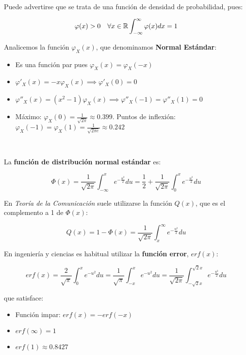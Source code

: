 \documentclass[11pt]{article}
\providecommand{\tightlist}{%
      \setlength{\itemsep}{0pt}\setlength{\parskip}{0pt}}
\begin{document}
Puede advertirse que se trata de una función de densidad de
probabilidad, pues:

\[\varphi(x) >0 \quad \forall x \in \mathbb{R}\\
\int_{-\infty}^\infty \varphi(x)dx = 1\]

    Analicemos la función \(\varphi_X(x)\), que denominamos \textbf{Normal
Estándar}:

\begin{itemize}
\tightlist
\item
  Es una función par pues \(\varphi_X(x) = \varphi_X(-x)\)
\item
  \(\varphi'_X(x) = -x\varphi_X(x) \implies \varphi'_X(0) = 0\)
\item
  \(\varphi''_X(x) = (x^2-1)\varphi_X(x) \implies \varphi''_X(-1) = \varphi''_X(1) = 0\)
\item
  Máximo: \(\varphi_X(0) = \frac{1}{\sqrt{2\pi}}\approx 0.399\). Puntos
  de inflexión:
  \(\varphi_X(-1) = \varphi_X(1) =\frac{1}{\sqrt{2\pi e}}\approx 0.242\)
\end{itemize}

    \begin{center}
    \end{center}
    { \hspace*{\fill} \\}
    
    La \textbf{función de distribución normal estándar} es:

\[\Phi(x) = \frac{1}{\sqrt{2\pi}} \int_{-\infty}^x  e^{-\frac{u^2}{2}} du = 
\frac{1}{2} + \frac{1}{\sqrt{2\pi}} \int_{0}^x  e^{-\frac{u^2}{2}} du
\]

En \emph{Teoría de la Comunicación} suele utilizarse la función
\(Q(x)\), que es el complemento a 1 de \(\Phi(x)\):

\[Q(x) = 1-\Phi(x) = \frac{1}{\sqrt{2\pi}} \int_x^{\infty}  e^{-\frac{u^2}{2}} du\]

    En ingeniería y ciencias es habitual utilizar la \textbf{función error},
\(erf(x)\):

\[erf(x) = \frac{2}{\sqrt{\pi}}\int_0^x e^{-u^2}du = \frac{1}{\sqrt{\pi}}\int_{-x}^x e^{-u^2}du= \frac{1}{\sqrt{2\pi}}\int_{-\sqrt{2}x}^{\sqrt{2}x} e^{-\frac{u^2}{2}}du\]

que satisface:

\begin{itemize}
\tightlist
\item
  Función impar: \(erf(x)=-erf(-x)\)
\item
  \(erf(\infty)=1\)
\item
  \(erf(1) \approx 0.8427\)
\end{itemize}
\end{document}
